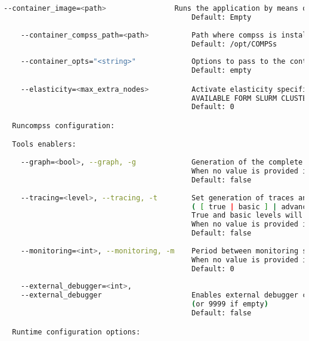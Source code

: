 \begin{lstlisting}[language=bash]
    --container_image=<path>                Runs the application by means of a container engine image
                                            Default: Empty
                                            
    --container_compss_path=<path>          Path where compss is installed in the container image
                                            Default: /opt/COMPSs
                                            
    --container_opts="<string>"             Options to pass to the container engine
                                            Default: empty

    --elasticity=<max_extra_nodes>          Activate elasticity specifiying the maximum extra nodes (ONLY
                                            AVAILABLE FORM SLURM CLUSTERS WITH NIO ADAPTOR)
                                            Default: 0

  Runcompss configuration:

  Tools enablers:
  
    --graph=<bool>, --graph, -g             Generation of the complete graph (true/false)
                                            When no value is provided it is set to true
                                            Default: false
                                            
    --tracing=<level>, --tracing, -t        Set generation of traces and/or tracing level
                                            ( [ true | basic ] | advanced | false)
                                            True and basic levels will produce the same traces.
                                            When no value is provided it is set to true
                                            Default: false
                                            
    --monitoring=<int>, --monitoring, -m    Period between monitoring samples (milliseconds)
                                            When no value is provided it is set to 2000
                                            Default: 0
                                            
    --external_debugger=<int>,
    --external_debugger                     Enables external debugger connection on the specified port
                                            (or 9999 if empty)
                                            Default: false

  Runtime configuration options:
  

\end{lstlisting}
